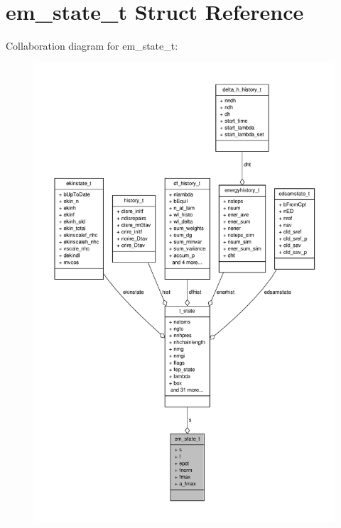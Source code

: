 \hypertarget{structem__state__t}{\section{em\-\_\-state\-\_\-t \-Struct \-Reference}
\label{structem__state__t}
}


\-Collaboration diagram for em\-\_\-state\-\_\-t\-:
\nopagebreak
\begin{figure}[H]
\begin{center}
\leavevmode
\includegraphics[width=350pt]{structem__state__t__coll__graph}
\end{center}
\end{figure}
